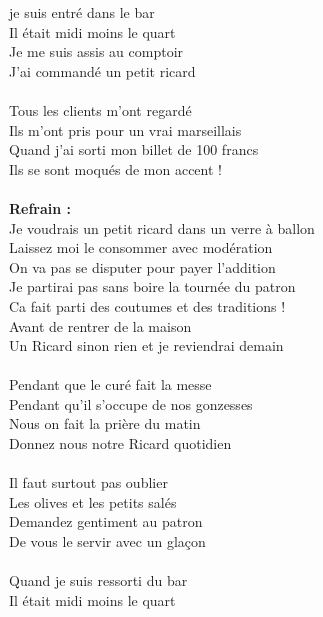 
 je suis entré dans le bar
\\Il était midi moins le quart
\\Je me suis assis au comptoir
\\J'ai commandé un petit ricard
\\\\Tous les clients m'ont regardé
\\Ils m'ont pris pour un vrai marseillais
\\Quand j'ai sorti mon billet de 100 francs
\\Ils se sont moqués de mon accent !
\\\\\textbf{Refrain :}
\\Je voudrais un petit ricard dans un verre à ballon
\\Laissez moi le consommer avec modération
\\On va pas se disputer pour payer l'addition
\\Je partirai pas sans boire la tournée du patron
\\Ca fait parti des coutumes et des traditions !
\\Avant de rentrer de la maison
\\Un Ricard sinon rien et je reviendrai demain
\\\\Pendant que le curé fait la messe
\\Pendant qu'il s'occupe de nos gonzesses
\\Nous on fait la prière du matin
\\Donnez nous notre Ricard quotidien
\\\\Il faut surtout pas oublier
\\Les olives et les petits salés
\\Demandez gentiment au patron
\\De vous le servir avec un glaçon
\\\\Quand je suis ressorti du bar
\\Il était midi moins le quart
